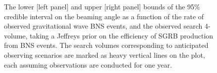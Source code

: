 \documentclass[openleft]{kentigern}
\theoremstyle{definition}
\begin{document}
\begin{figure}[b]
  \checkoddpage
   
  \caption{
    The lower [left panel] and upper [right panel] bounds of
    the 95\% credible interval on the beaming angle as a function of
    the rate of observed gravitational wave BNS events, and the
    observed search 4-volume, taking a Jeffreys prior on the
    efficiency of SGRB production from BNS events. The search volumes
    corresponding to anticipated observing scenarios are marked as
    heavy vertical lines on the plot, each assuming observations are
    conducted for one year.
    \label{fig:beaming-jeffreys}
    }
\end{figure}
\end{document}
